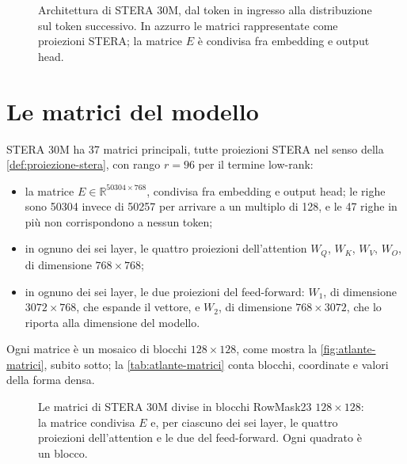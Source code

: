 \begin{figure}[H]
\centering
\resizebox{.92\linewidth}{!}{}
\caption{Architettura di STERA 30M, dal token in ingresso alla distribuzione sul token successivo. In azzurro le matrici rappresentate come proiezioni STERA; la matrice $E$ è condivisa fra embedding e output head.}
\label{fig:stera30m-flusso}
\end{figure}

\section{Le matrici del modello}
\label{sec:atlante-matrici}

STERA 30M ha 37 matrici principali, tutte proiezioni STERA nel senso della \autoref{def:proiezione-stera}, con rango $r=96$ per il termine low-rank:
\begin{itemize}
\item la matrice $E\in\mathbb{R}^{\num{50304}\times768}$, condivisa fra embedding e output head; le righe sono \num{50304} invece di \num{50257} per arrivare a un multiplo di 128, e le 47 righe in più non corrispondono a nessun token;
\item in ognuno dei sei layer, le quattro proiezioni dell'attention $W_Q$, $W_K$, $W_V$, $W_O$, di dimensione $768\times768$;
\item in ognuno dei sei layer, le due proiezioni del feed-forward: $W_1$, di dimensione $\num{3072}\times768$, che espande il vettore, e $W_2$, di dimensione $768\times\num{3072}$, che lo riporta alla dimensione del modello.
\end{itemize}
Ogni matrice è un mosaico di blocchi $128\times128$, come mostra la \autoref{fig:atlante-matrici}, subito sotto; la \autoref{tab:atlante-matrici} conta blocchi, coordinate e valori della forma densa.

\begin{figure}[H]
\centering

\caption{Le matrici di STERA 30M divise in blocchi RowMask23 $128\times128$: la matrice condivisa $E$ e, per ciascuno dei sei layer, le quattro proiezioni dell'attention e le due del feed-forward. Ogni quadrato è un blocco.}
\label{fig:atlante-matrici}
\end{figure}


